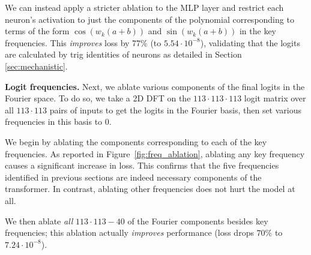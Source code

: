 \documentclass{article} %
\begin{document}
We can instead apply a stricter ablation to the MLP layer and restrict each neuron's activation to just the components of the polynomial corresponding to terms of the form $\cos(w_k(a+b))$ and $\sin(w_k(a+b))$ in the key frequencies. This \textit{improves} loss by 77\% (to $5.54 \cdot 10^{-8}$), validating that the logits are calculated by trig identities of neurons as detailed in Section \ref{sec:mechanistic}.

\textbf{Logit frequencies.} 
Next, we ablate various components of the final logits in the Fourier space. To do so, we take a 2D DFT on the $113 \cdot  113 \cdot 113$ logit matrix over all $113 \cdot 113$ pairs of inputs to get the logits in the Fourier basis, then set various frequencies in this basis to 0.

We begin by ablating the components corresponding to each of the key frequencies. %
As reported in Figure~\ref{fig:freq_ablation}, ablating any key frequency causes a significant increase in loss. This confirms that the five frequencies identified in previous sections are indeed necessary components of the transformer. In contrast, ablating other frequencies does not hurt the model at all.

 We then ablate \emph{all} $113 \cdot 113 - 40$ of the Fourier components besides key frequencies; this ablation actually \textit{improves} performance (loss drops $70\%$ to $ 7.24 \cdot 10^{-8}$). %
\end{document}
